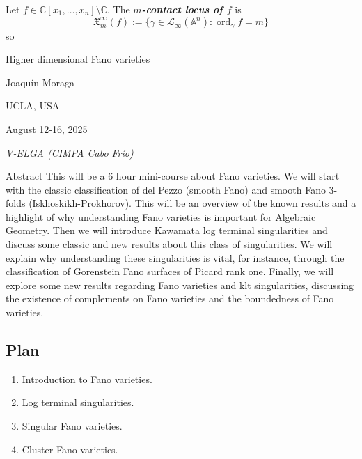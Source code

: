 \begin{defn}\leavevmode
	Let \(f \in \mathbb{C}[x_1,\ldots,x_n]\setminus \mathbb{C}\). The \textit{\textbf{\(m\)-contact locus of \(f\)}} is
	\[\mathfrak{X}_{m}^\infty(f):=\{\gamma \in \mathcal{L}_\infty(\mathbb{A}^n): \operatorname{ord}_\gamma f=m\}\]
	so
\end{defn}\fi

\clearpage{}
{\Huge Higher dimensional Fano varieties}

\hfill{\Large Joaquín Moraga}

{\Large \hfill UCLA, USA}

\hfill{\large August 12-16, 2025

\hfill \textit{V-ELGA (CIMPA Cabo Frío)}}

\vspace{2em}

\begin{thing4}{Abstract}
This will be a 6 hour mini-course about Fano varieties.
We will start with the classic classification of del Pezzo (smooth
Fano) and smooth Fano 3-folds (Iskhoskikh-Prokhorov). This will
be an overview of the known results and a highlight of why understanding Fano varieties is important for Algebraic Geometry. Then
we will introduce Kawamata log terminal singularities and discuss
some classic and new results about this class of singularities. We will
explain why understanding these singularities is vital, for instance,
through the classification of Gorenstein Fano surfaces of Picard rank
one. Finally, we will explore some new results regarding Fano varieties and klt singularities, discussing the existence of complements
on Fano varieties and the boundedness of Fano varieties.
\end{thing4}
\vspace{2em}

\subsection*{Plan}

\begin{enumerate}
	\item Introduction to Fano varieties.
	\item Log terminal singularities.
	\item Singular Fano varieties.
	\item Cluster Fano varieties.
\end{enumerate}

